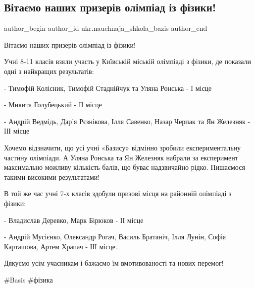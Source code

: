  
 
 
 
 
 
\subsection{Вітаємо наших призерів олімпіад із фізики!}
\label{sec:14_02_2022.fb.ukr.nauchnaja_shkola_bazis.1.olimpiada_fizika}
 
\ifcmt
 author_begin
   author_id ukr.nauchnaja_shkola_bazis
 author_end
\fi

Вітаємо наших призерів олімпіад із фізики! 

Учні 8-11 класів взяли участь у Київській міській олімпіаді з фізики, де
показали одні з найкращих результатів:

- Тимофій Колісник, Тимофій Стаднійчук та Уляна Ронська - І місце

- Микита Голубецький - ІІ місце

- Андрій Ведмідь, Дар’я Рєзнікова, Ілля Савенко, Назар Черпак та Ян Железняк -
ІІІ місце


Хочемо відзначити, що усі учні «Базису» відмінно зробили експериментальну
частину олімпіади. А Уляна Ронська та Ян Железняк набрали за експеримент
максимально можливу кількість балів, що буває надзвичайно рідко. Пишаємося
такими високими результатами!

В той же час учні 7-х класів здобули призові місця на районній олімпіаді з
фізики:

- Владислав Деревко, Марк Бірюков - ІІ місце

- Андрій Мусієнко, Олександр Рогач, Василь Братаніч, Ілля Лунін, Софія
Карташова, Артем Храпач - ІІІ місце. 

Дякуємо усім учасникам і бажаємо їм вмотивованості та нових перемог! 

\#Basis \#фізика
